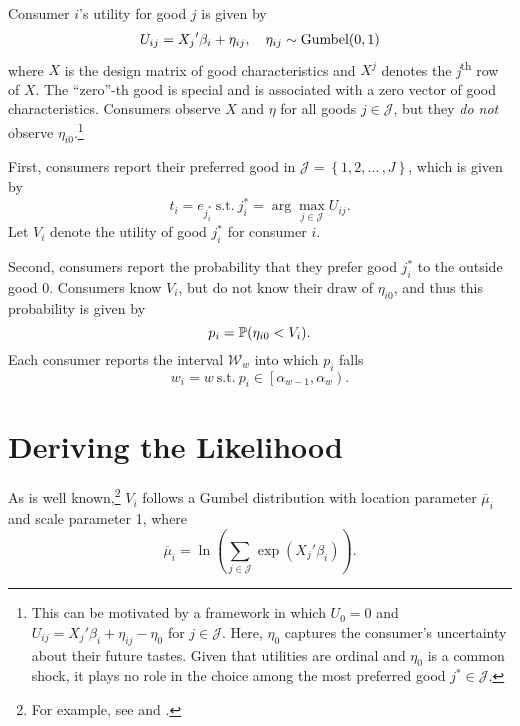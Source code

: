 \documentclass{article}
\begin{document}
Consumer $i$'s utility for good $j$ is given by
\begin{equation}
    U_{ij} = {X_j}'\beta_i + \eta_{ij},\quad \eta_{ij} \sim \text{Gumbel}\mleft(0,1\mright)
\end{equation}
where $X$ is the design matrix of good characteristics and $X^j$ denotes the \textit{j}\textsuperscript{th} row of $X$. The ``zero''-th good is special and is associated with a zero vector of good characteristics. Consumers observe $X$ and $\eta$ for all goods $j \in \mathcal{J}$, but they \emph{do not} observe $\eta_{i0}$.\footnote{This can be motivated by a framework in which $U_0 = 0$ and $U_{ij} = {X_j}'\beta_i + \eta_{ij} - \eta_0$ for $j \in \mathcal{J}$. Here, $\eta_0$ captures the consumer's uncertainty about their future tastes. Given that utilities are ordinal and $\eta_0$ is a common shock, it plays no role in the choice among the most preferred good $j^* \in \mathcal{J}$.}

First, consumers report their preferred good in $\mathcal{J} = \left\lbrace 1, 2, \ldots\,, J\right\rbrace$, which is given by
\begin{equation}
    t_i = e_{j^*_i}\ \text{s.t.}\ j^*_i = \arg\max_{j\in\mathcal{J}} U_{ij}.
\end{equation}
Let $V_i$ denote the utility of good $j^*_i$ for consumer $i$.

Second, consumers report the probability that they prefer good $j^*_i$ to the outside good 0. Consumers know $V_i$, but do not know their draw of $\eta_{i0}$, and thus this probability is given by
\begin{equation}
    p_i = \mathbb{P}\mleft(\eta_{i0} < V_i \mright).
\end{equation}
Each consumer reports the interval $\mathcal{W}_w$ into which $p_i$ falls
\begin{equation}
    w_i = w\ \text{s.t.}\ p_i \in \left[\alpha_{w-1},\alpha_w\right).
\end{equation}

\section{Deriving the Likelihood}
As is well known,\footnote{For example, see \textcite{Mcfadden_1981} and \textcite{Cardell_1997}.} $V_i$ follows a Gumbel distribution with location parameter $\overline{\mu}_i$ and scale parameter 1, where
\begin{equation}
    \overline{\mu}_i = \ln\left( \sum_{j\in\mathcal{J}} \exp\left({X_j}'\beta_i\right)\right) \label{eqn:max_mu}.
\end{equation}
\end{document}
